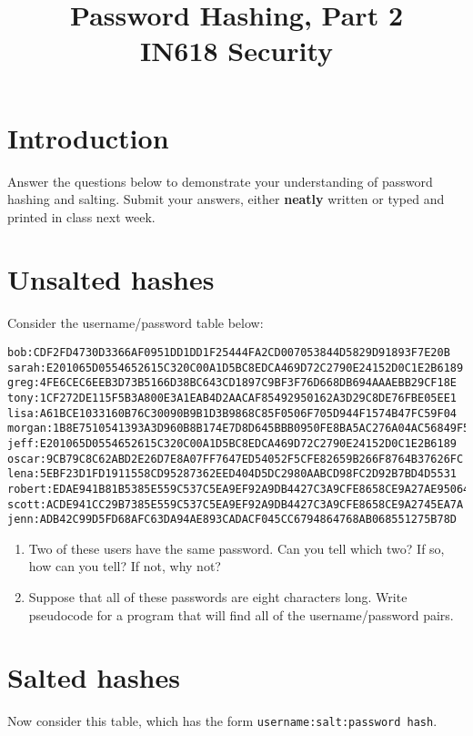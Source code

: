 \documentclass{article}
\begin{document}
\title{Password Hashing, Part 2\\ IN618 Security}
\date{}
\maketitle

\section*{Introduction}
Answer the questions below to demonstrate your understanding of password hashing and salting. Submit your answers, either \textbf{neatly} written or typed and printed in class next week.


\section{Unsalted hashes}

Consider the username/password table below:

\begin{verbatim}
bob:CDF2FD4730D3366AF0951DD1DD1F25444FA2CD007053844D5829D91893F7E20B
sarah:E201065D0554652615C320C00A1D5BC8EDCA469D72C2790E24152D0C1E2B6189
greg:4FE6CEC6EEB3D73B5166D38BC643CD1897C9BF3F76D668DB694AAAEBB29CF18E
tony:1CF272DE115F5B3A800E3A1EAB4D2AACAF85492950162A3D29C8DE76FBE05EE1
lisa:A61BCE1033160B76C30090B9B1D3B9868C85F0506F705D944F1574B47FC59F04
morgan:1B8E7510541393A3D960B8B174E7D8D645BBB0950FE8BA5AC276A04AC56849F5
jeff:E201065D0554652615C320C00A1D5BC8EDCA469D72C2790E24152D0C1E2B6189
oscar:9CB79C8C62ABD2E26D7E8A07FF7647ED54052F5CFE82659B266F8764B37626FC
lena:5EBF23D1FD1911558CD95287362EED404D5DC2980AABCD98FC2D92B7BD4D5531
robert:EDAE941B81B5385E559C537C5EA9EF92A9DB4427C3A9CFE8658CE9A27AE95064
scott:ACDE941CC29B7385E559C537C5EA9EF92A9DB4427C3A9CFE8658CE9A2745EA7A
jenn:ADB42C99D5FD68AFC63DA94AE893CADACF045CC6794864768AB068551275B78D
\end{verbatim}

\begin{enumerate}
	\item Two of these users have the same password.  Can you tell which two?  If so, how can you tell?  If not, why not?
	\item Suppose that all of these passwords are eight characters long.  Write pseudocode for a program that will find all of the username/password pairs.
\end{enumerate}

\newpage

\section{Salted hashes}
Now consider this table, which has the form \texttt{username:salt:password hash}.
\end{document}
